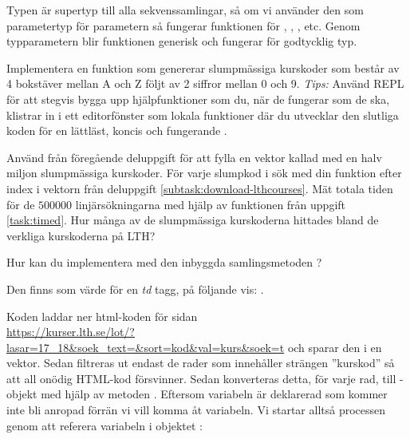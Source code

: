 Typen  är supertyp till alla sekvenssamlingar, så om vi använder den som parametertyp för parametern  så fungerar funktionen för , , , etc. Genom typparametern  blir funktionen generisk och fungerar för godtycklig typ.



\Subtask \label{subtask:linsearch-rndCode} Implementera en funktion  som genererar slumpmässiga kurskoder som består av 4 bokstäver mellan A och Z följt av 2 siffror mellan 0 och 9. \emph{Tips:} Använd REPL  för att stegvis bygga upp hjälpfunktioner som du, när de fungerar som de ska, klistrar in i ett editorfönster som lokala funktioner där du utvecklar den slutliga koden för en lättläst, koncis och fungerande .


\Subtask Använd  från föregående deluppgift för att fylla en vektor kallad  med en halv miljon slumpmässiga kurskoder. För varje slumpkod i  sök med din funktion  efter index i vektorn  från deluppgift \ref{subtask:download-lthcourses}. Mät totala tiden för de $500000$ linjärsökningarna med hjälp av funktionen  från uppgift \ref{task:timed}. Hur många av de slumpmässiga kurskoderna hittades bland de verkliga kurskoderna på LTH?



\Subtask\Pen Hur kan du implementera  med den inbyggda samlingsmetoden ?



\SOLUTION


\TaskSolved \what


\SubtaskSolved
Den finns som värde för en \emph{td} tagg, på följande vis: .

\SubtaskSolved
Koden laddar ner html-koden för sidan \\ \mbox{\small\url{https://kurser.lth.se/lot/?lasar=17_18&soek_text=&sort=kod&val=kurs&soek=t}} och sparar den i en vektor. Sedan filtreras ut endast de rader som innehåller strängen ”kurskod” så att all onödig HTML-kod försvinner. Sedan konverteras detta, för varje rad, till -objekt med hjälp av metoden . Eftersom variabeln  är deklarerad som  kommer inte  bli anropad förrän vi vill komma åt variabeln. Vi startar alltså processen genom att referera variabeln  i objektet :


